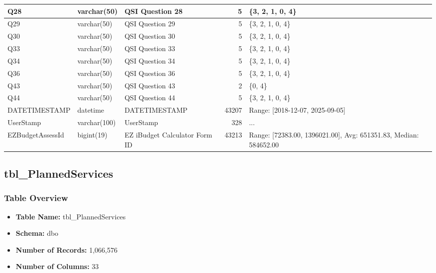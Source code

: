 \begin{landscape}
\begin{longtable}{|l|l|l|r|p{6cm}|}
\hline
Q28 & varchar(50) & QSI Question 28 & 5 & \{3, 2, 1, 0, 4\} \\
\hline
Q29 & varchar(50) & QSI Question 29 & 5 & \{3, 2, 1, 0, 4\} \\
\hline
Q30 & varchar(50) & QSI Question 30 & 5 & \{3, 2, 1, 0, 4\} \\
\hline
Q33 & varchar(50) & QSI Question 33 & 5 & \{3, 2, 1, 0, 4\} \\
\hline
Q34 & varchar(50) & QSI Question 34 & 5 & \{3, 2, 1, 0, 4\} \\
\hline
Q36 & varchar(50) & QSI Question 36 & 5 & \{3, 2, 1, 0, 4\} \\
\hline
Q43 & varchar(50) & QSI Question 43 & 2 & \{0, 4\} \\
\hline
Q44 & varchar(50) & QSI Question 44 & 5 & \{3, 2, 1, 0, 4\} \\
\hline
DATETIMESTAMP & datetime & DATETIMESTAMP & 43207 & Range: [2018-12-07, 2025-09-05] \\
\hline
UserStamp & varchar(100) & UserStamp & 328 & ... \\
\hline
EZBudgetAssessId & bigint(19) & EZ iBudget Calculator Form ID & 43213 & Range: [72383.00, 1396021.00], Avg: 651351.83, Median: 584652.00 \\
\hline
\end{longtable}

\subsection{tbl\_PlannedServices}

\subsubsection{Table Overview}
\begin{itemize}
\item \textbf{Table Name:} tbl\_PlannedServices
\item \textbf{Schema:} dbo
\item \textbf{Number of Records:} 1,066,576
\item \textbf{Number of Columns:} 33
\end{itemize}


\end{landscape}
